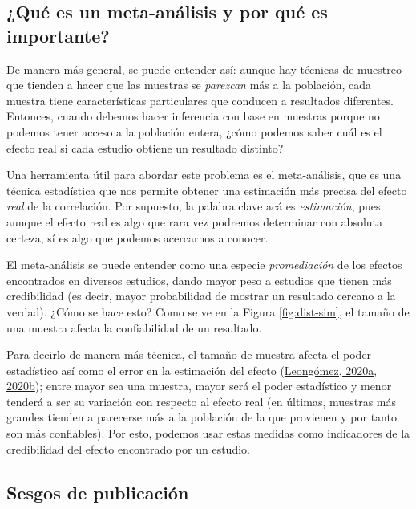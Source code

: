 \documentclass[
  bookmarksnumbered]{article}
\begin{document}
\hypertarget{quuxe9-es-un-meta-anuxe1lisis-y-por-quuxe9-es-importante}{%
\subsection{¿Qué es un meta-análisis y por qué es importante?}\label{quuxe9-es-un-meta-anuxe1lisis-y-por-quuxe9-es-importante}}

De manera más general, se puede entender así: aunque hay técnicas de muestreo que tienden a hacer que las muestras se \emph{parezcan} más a la población, cada muestra tiene características particulares que conducen a resultados diferentes. Entonces, cuando debemos hacer inferencia con base en muestras porque no podemos tener acceso a la población entera, ¿cómo podemos saber cuál es el efecto real si cada estudio obtiene un resultado distinto?

Una herramienta útil para abordar este problema es el meta-análisis, que es una técnica estadística que nos permite obtener una estimación más precisa del efecto \emph{real} de la correlación. Por supuesto, la palabra clave acá es \emph{estimación}, pues aunque el efecto real es algo que rara vez podremos determinar con absoluta certeza, sí es algo que podemos acercarnos a conocer.

El meta-análisis se puede entender como una especie \emph{promediación} de los efectos encontrados en diversos estudios, dando mayor peso a estudios que tienen más credibilidad (es decir, mayor probabilidad de mostrar un resultado cercano a la verdad). ¿Cómo se hace esto? Como se ve en la Figura \ref{fig:dist-sim}, el tamaño de una muestra afecta la confiabilidad de un resultado.

Para decirlo de manera más técnica, el tamaño de muestra afecta el poder estadístico así como el error en la estimación del efecto (\protect\hyperlink{ref-leongomezAnalisisPoderEstadistico2020}{Leongómez, 2020a}, \protect\hyperlink{ref-leongomezPoderRvid2020}{2020b}); entre mayor sea una muestra, mayor será el poder estadístico y menor tenderá a ser su variación con respecto al efecto real (en últimas, muestras más grandes tienden a parecerse más a la población de la que provienen y por tanto son más confiables). Por esto, podemos usar estas medidas como indicadores de la credibilidad del efecto encontrado por un estudio.

\hypertarget{sesgos-de-publicaciuxf3n}{%
\subsection{Sesgos de publicación}\label{sesgos-de-publicaciuxf3n}}
\end{document}
